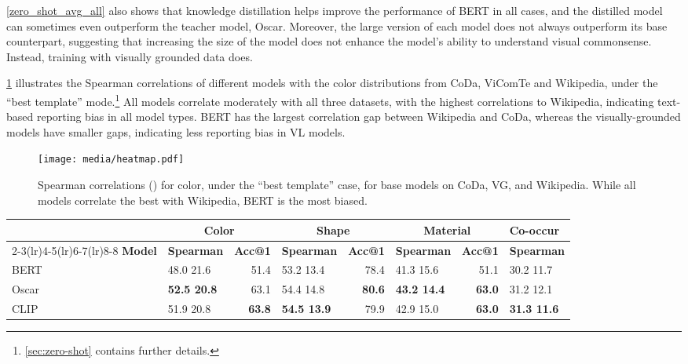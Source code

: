 \documentclass[11pt]{article}
\newcommand{\dataset}{ViComTe}
\begin{document}
\cref{zero_shot_avg_all} also shows that knowledge distillation helps improve the performance of BERT in all cases, and the distilled model can sometimes even outperform the teacher model, Oscar.
Moreover, the large version of each model does not always outperform its base counterpart, suggesting that increasing the size of the model does not enhance the model's ability to understand visual commonsense. Instead, training with visually grounded data does.

\cref{fig:heatmap} illustrates the Spearman correlations of different models with the color distributions from CoDa, {\dataset} and Wikipedia, under the ``best template'' mode.\footnote{\cref{sec:zero-shot} contains further details.} All models correlate moderately with all three datasets, with the highest correlations to Wikipedia, indicating text-based reporting bias in all model types. 
BERT has the largest correlation gap between Wikipedia and CoDa, whereas the visually-grounded models have smaller gaps, indicating less reporting bias in VL models.

\begin{figure}[t]
    \centering
    \texttt{[image: media/heatmap.pdf]}
    \caption{Spearman correlations () for color, under the ``best template'' case, for base models on CoDa, VG, and Wikipedia. While all models correlate the best with Wikipedia, BERT is the most biased.}
    \label{fig:heatmap}
\vspace{-0.9em}
\end{figure}


\begin{table*}[t!]
\small
\centering
\begin{tabular}{l|lr|lr|lr|l}
\hline
& \multicolumn{2}{c|}{\textbf{Color}} & \multicolumn{2}{c|}{\textbf{Shape}} & \multicolumn{2}{c|}{\textbf{Material}} & \textbf{Co-occur} \\
\cmidrule(lr){2-3}\cmidrule(lr){4-5}\cmidrule(lr){6-7}\cmidrule(lr){8-8}
\textbf{Model} & \textbf{Spearman } & \textbf{Acc@1} & \textbf{Spearman } & \textbf{Acc@1} & \textbf{Spearman } & \textbf{Acc@1} & \textbf{Spearman }\\
\hline
BERT & 48.0  21.6 & 51.4 & 53.2  13.4 & 78.4 & 41.3  15.6 & 51.1 & 30.2  11.7 \\
Oscar & \textbf{52.5  20.8} & 63.1 & 54.4  14.8 & \textbf{80.6} & \textbf{43.2  14.4} & \textbf{63.0} & 31.2  12.1\\
CLIP & 51.9  20.8 & \textbf{63.8} & \textbf{54.5  13.9} & 79.9 & 42.9  15.0 & \textbf{63.0} & \textbf{31.3  11.6}\\
\hline
\end{tabular}
\caption{\label{logistic-reg}
Spearman correlation and top-1 accuracy (both  100) with a logistic regression head on model encoder outputs. Oscar and CLIP have comparable performance, both slightly better than BERT.}
\end{table*}
\end{document}
